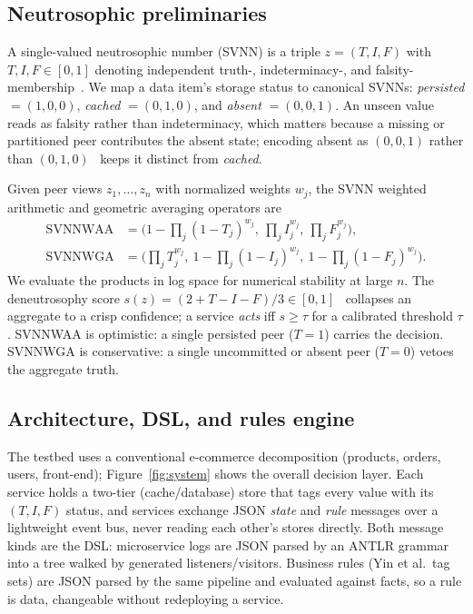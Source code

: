 \documentclass[11pt]{article}
\begin{document}
\subsection{Neutrosophic preliminaries}
A single-valued neutrosophic number (SVNN) is a triple $z=(T,I,F)$ with $T,I,F\in[0,1]$ denoting
independent truth-, indeterminacy-, and falsity-membership~\cite{wang2010svns}. We map a data item's
storage status to canonical SVNNs: \emph{persisted} $=(1,0,0)$, \emph{cached} $=(0,1,0)$, and
\emph{absent} $=(0,0,1)$. An unseen value reads as falsity rather than indeterminacy, which matters
because a missing or partitioned peer contributes the absent state; encoding absent as $(0,0,1)$ rather
than $(0,1,0)$~\cite{elghareeb2020neutro} keeps it distinct from \emph{cached}.

Given peer views $z_1,\dots,z_n$ with normalized weights $w_j$, the SVNN weighted arithmetic and
geometric averaging operators are
\begin{align}
\mathrm{SVNNWAA} &= \Big(1-\textstyle\prod_j (1-T_j)^{w_j},\ \prod_j I_j^{w_j},\ \prod_j F_j^{w_j}\Big),
\label{eq:waa}\\
\mathrm{SVNNWGA} &= \Big(\textstyle\prod_j T_j^{w_j},\ 1-\prod_j (1-I_j)^{w_j},\ 1-\prod_j (1-F_j)^{w_j}\Big).
\label{eq:wga}
\end{align}
We evaluate the products in log space for numerical stability at large $n$. The deneutrosophy score
$s(z)=(2+T-I-F)/3\in[0,1]$~\cite{ye2014score} collapses an aggregate to a crisp confidence; a service
\emph{acts} iff $s\geq\tau$ for a calibrated threshold $\tau$. SVNNWAA is optimistic: a single
persisted peer ($T=1$) carries the decision. SVNNWGA is conservative: a single uncommitted or absent
peer ($T=0$) vetoes the aggregate truth.

\subsection{Architecture, DSL, and rules engine}
The testbed uses a conventional e-commerce decomposition (products, orders, users, front-end);
Figure~\ref{fig:system} shows the overall decision layer. Each
service holds a two-tier (cache/database) store that tags every value with its $(T,I,F)$ status, and
services exchange JSON \emph{state} and \emph{rule} messages over a lightweight event bus, never
reading each other's stores directly. Both message kinds are the DSL: microservice logs are JSON
parsed by an ANTLR grammar into a tree walked by generated listeners/visitors. Business rules
(Yin et al.\ tag sets) are JSON parsed by the same pipeline and evaluated against facts, so a rule is
data, changeable without redeploying a service.
\end{document}
